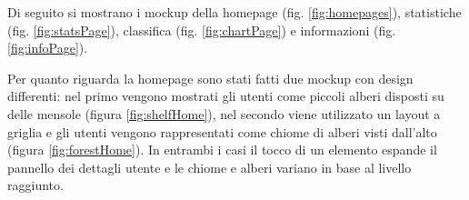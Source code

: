 Di seguito si mostrano i mockup della homepage (fig. \ref{fig:homepages}), statistiche (fig. \ref{fig:statsPage}), classifica (fig. \ref{fig:chartPage}) e informazioni (fig. \ref{fig:infoPage}).



Per quanto riguarda la homepage sono stati fatti due mockup con design differenti: nel primo vengono mostrati gli utenti come piccoli alberi disposti su delle mensole (figura \ref{fig:shelfHome}), nel secondo viene utilizzato un layout a griglia e gli utenti vengono rappresentati come chiome di alberi visti dall'alto (figura \ref{fig:forestHome}). In entrambi i casi il tocco di un elemento espande il pannello dei dettagli utente e le chiome e alberi variano in base al livello raggiunto.

